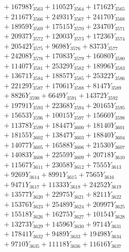 \documentclass[a4paper,10pt]{article}
\begin{document}
{\begin{align}
&\;  + 16798 Y_{3563} + 11052 Y_{3564} + 17162 Y_{3565} \\[0.3ex]
&\;  + 21167 Y_{3566} + 24931 Y_{3567} + 24170 Y_{3568} \\[0.5ex]\allowbreak
&\;  + 18959 Y_{3569} + 17515 Y_{3570} + 23470 Y_{3571} \\[0.3ex]
&\;  + 20937 Y_{3572} + 12003 Y_{3573} + 17236 Y_{3574} \\[0.3ex]
&\;  + 20542 Y_{3575} + 9698 Y_{3576} + 8373 Y_{3577} \\[0.3ex]
&\;  + 24208 Y_{3578} + 17083 Y_{3579} + 16080 Y_{3580} \\[0.3ex]
&\;  + 11407 Y_{3581} + 25329 Y_{3582} + 18996 Y_{3583} \\[0.3ex]
&\;  + 13671 Y_{3584} + 18857 Y_{3585} + 25322 Y_{3586} \\[0.3ex]
&\;  + 22129 Y_{3587} + 17061 Y_{3588} + 8147 Y_{3589} \\[0.3ex]
&\;  + 8826 Y_{3590} + 6649 Y_{3591} + 14372 Y_{3592} \\[0.3ex]
&\;  + 19791 Y_{3593} + 22368 Y_{3594} + 20165 Y_{3595} \\[0.3ex]
&\;  + 15653 Y_{3596} + 10015 Y_{3597} + 15660 Y_{3598} \\[0.5ex]\allowbreak
&\;  + 11378 Y_{3599} + 18447 Y_{3600} + 18140 Y_{3601} \\[0.3ex]
&\;  + 18155 Y_{3602} + 13847 Y_{3603} + 18840 Y_{3604} \\[0.3ex]
&\;  + 14077 Y_{3605} + 16588 Y_{3606} + 21530 Y_{3607} \\[0.3ex]
&\;  + 14083 Y_{3608} + 22559 Y_{3609} + 20718 Y_{3610} \\[0.3ex]
&\;  + 11567 Y_{3611} + 23058 Y_{3612} + 7555 Y_{3613} \\[0.3ex]
&\;  + 9269 Y_{3614} + 8991 Y_{3615} + 7565 Y_{3616} \\[0.3ex]
&\;  + 9471 Y_{3617} + 11333 Y_{3618} + 24252 Y_{3619} \\[0.3ex]
&\;  + 13577 Y_{3620} + 22975 Y_{3621} + 8211 Y_{3622} \\[0.3ex]
&\;  + 15376 Y_{3623} + 25489 Y_{3624} + 20997 Y_{3625} \\[0.3ex]
&\;  + 15518 Y_{3626} + 16275 Y_{3627} + 10154 Y_{3628} \\[0.5ex]\allowbreak
&\;  + 13273 Y_{3629} + 14596 Y_{3630} + 9714 Y_{3631} \\[0.3ex]
&\;  + 17841 Y_{3632} + 9489 Y_{3633} + 19498 Y_{3634} \\[0.3ex]
&\;  + 9710 Y_{3635} + 11118 Y_{3636} + 11616 Y_{3637} \\[0.3ex]

\end{align}}
\end{document}
